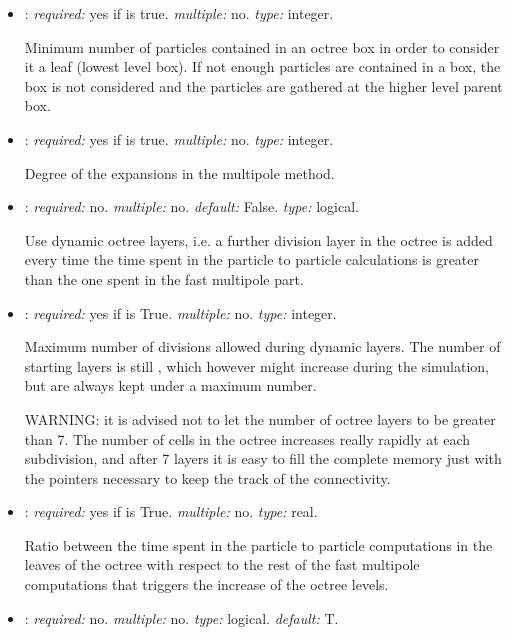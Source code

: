 \begin{itemize}
\item {}: \textit{required:} yes if  is true. 
\textit{multiple:} no. \textit{type:} integer.

Minimum number of particles contained in an octree box in order to consider 
it a leaf (lowest level box). If not enough particles are contained in a 
box, the box is not considered and the particles are gathered at the higher 
level parent box.

\item {}: \textit{required:} yes if  is true. 
\textit{multiple:} no. \textit{type:} integer.

Degree of the expansions in the multipole method. 

\item {}: \textit{required:} no. \textit{multiple:} no. 
\textit{default:} False. \textit{type:} logical.

Use dynamic octree layers, i.e. a further division layer in the octree 
is added every time the time spent in the particle to particle calculations 
is greater than the one spent in the fast multipole part.

\item {}: \textit{required:} yes if  is True. 
\textit{multiple:} no. \textit{type:} integer.

Maximum number of divisions allowed during dynamic layers. The number of starting 
layers is still , which however might increase during the 
simulation, but are always kept under a maximum number. 

WARNING: it is advised not to let the number of octree layers to be greater than 7. 
The number of cells in the octree increases really rapidly at each subdivision, 
and after 7 layers it is easy to fill the complete memory just with the pointers 
necessary to keep the track of the connectivity. 

\item {}: \textit{required:} yes if  is True. 
\textit{multiple:} no. \textit{type:} real.

Ratio between the time spent in the particle to particle computations in the 
leaves of the octree with respect to the rest of the fast multipole computations 
that triggers the increase of the octree levels.

\item {}: \textit{required:} no. 
\textit{multiple:} no. \textit{type:} logical. \textit{default:} T. 


\end{itemize}
